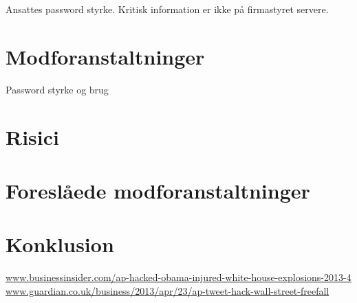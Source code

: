 \documentclass{article}
\begin{document}
Ansattes password styrke.
Kritisk information er ikke på firmastyret servere.


\section{Modforanstaltninger}

Password styrke og brug

\section{Risici}



\section{Foreslåede modforanstaltninger}



\section{Konklusion}


\newpage
\begin{thebibliography}{100}


\url{www.businessinsider.com/ap-hacked-obama-injured-white-house-explosions-2013-4}
\url{www.guardian.co.uk/business/2013/apr/23/ap-tweet-hack-wall-street-freefall}
\end{thebibliography}
\end{document}
